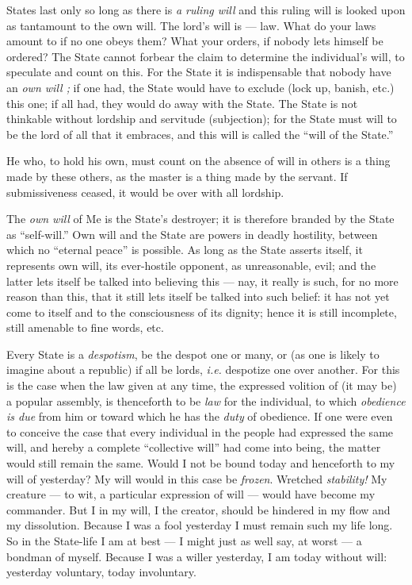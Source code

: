 States last only so long as there is \textit{a ruling will} and this ruling 
will is looked upon as tantamount to the own will. The lord's will is --- law. 
What do your laws amount to if no one obeys them? What your orders, if nobody 
lets himself be ordered? The State cannot forbear the claim to determine the 
individual's will, to speculate and count on this. For the State it is 
indispensable that nobody have an \textit{own will ;} if one had, the State 
would have to exclude (lock up, banish, etc.) this one; if all had, they would 
do away with the State. The State is not thinkable without lordship and 
servitude (subjection); for the State must will to be the lord of all that it 
embraces, and this will is called the ``will of the State.''

He who, to hold his own, must count on the absence of will in others is a 
thing made by these others, as the master is a thing made by the servant. If 
submissiveness ceased, it would be over with all lordship.

The \textit{own will} of Me is the State's destroyer; it is therefore branded 
by the State as ``self-will.'' Own will and the State are powers in deadly 
hostility, between which no ``eternal peace'' is possible. As long as the 
State asserts itself, it represents own will, its ever-hostile opponent, as 
unreasonable, evil; and the latter lets itself be talked into believing this --- nay, it really is such, for no more reason than this, that it still lets 
itself be talked into such belief: it has not yet come to itself and to the 
consciousness of its dignity; hence it is still incomplete, still amenable to 
fine words, etc.

Every State is a \textit{despotism}, be the despot one or many, or (as one is 
likely to imagine about a republic) if all be lords, \textit{i.e.} despotize 
one over another. For this is the case when the law given at any time, the 
expressed volition of (it may be) a popular assembly, is thenceforth to be 
\textit{law} for the individual, to which \textit{obedience is due} from him 
or toward which he has the \textit{duty} of obedience. If one were even to 
conceive the case that every individual in the people had expressed the same 
will, and hereby a complete ``collective will'' had come into being, the 
matter would still remain the same. Would I not be bound today and henceforth 
to my will of yesterday? My will would in this case be \textit{frozen}. 
Wretched \textit{stability!} My creature --- to wit, a particular expression of 
will --- would have become my commander. But I in my will, I the creator, 
should be hindered in my flow and my dissolution. Because I was a fool 
yesterday I must remain such my life long. So in the State-life I am at best --- I might just as well say, at worst --- a bondman of myself. Because I was a 
willer yesterday, I am today without will: yesterday voluntary, today 
involuntary.

